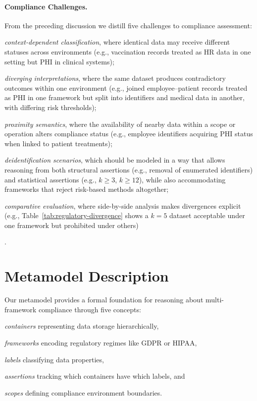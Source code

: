 \documentclass{IOS-Book-Article}
\begin{document}
\paragraph{Compliance Challenges.}
From the preceding discussion we distill five challenges to compliance assessment:
\begin{enumerate*}[label=(\arabic*)]
  \item \emph{context-dependent classification}, where identical data may receive different statuses across environments (e.g., vaccination records treated as HR data in one setting but PHI in clinical systems);
  \item \emph{diverging interpretations}, where the same dataset produces contradictory outcomes within one environment (e.g., joined employee–patient records treated as PHI in one framework but split into identifiers and medical data in another, with differing risk thresholds);
  \item \emph{proximity semantics}, where the availability of nearby data within a scope or operation alters compliance status (e.g., employee identifiers acquiring PHI status when linked to patient treatments);
  \item \emph{de\-identification scenarios}, which should be modeled in a way that allows reasoning from both structural assertions (e.g., removal of enumerated identifiers) and statistical assertions (e.g., $k \geq 3$, $k \geq 12$), while also accommodating frameworks that reject risk-based methods altogether;
  \item \emph{comparative evaluation}, where side-by-side analysis makes divergences explicit (e.g., Table~\ref{tab:regulatory-divergence} shows a $k=5$ dataset acceptable under one framework but prohibited under others)
\end{enumerate*}.

\section{Metamodel Description}\label{sec:concepts}

Our metamodel provides a formal foundation for reasoning about multi-framework compliance through five concepts:
\begin{enumerate*}[label=(\roman*)]
\item \emph{containers} representing data storage hierarchically,
\item \emph{frameworks} encoding regulatory regimes like GDPR or HIPAA,
\item \emph{labels} classifying data properties,
\item \emph{assertions} tracking which containers have which labels, and
\item \emph{scopes} defining compliance environment boundaries.
\end{enumerate*}
\end{document}
